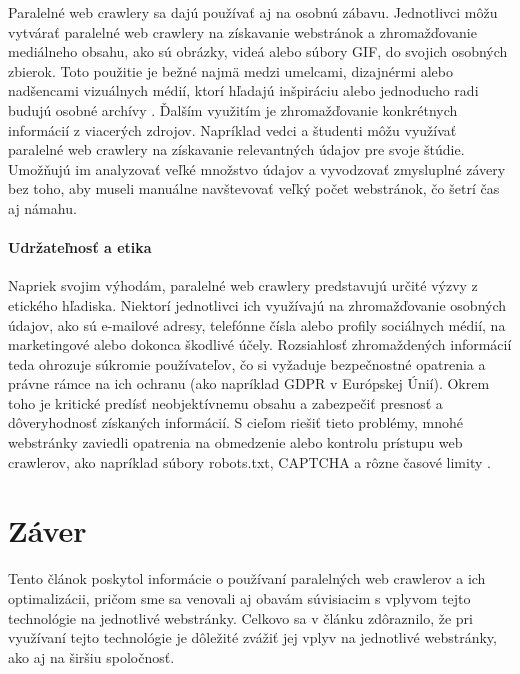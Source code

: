\documentclass[10pt,twoside,slovak,a4paper]{article}
\begin{document}
Paralelné web crawlery sa dajú používať aj na osobnú zábavu. Jednotlivci môžu vytvárať paralelné web crawlery na získavanie webstránok a zhromažďovanie mediálneho obsahu, ako sú obrázky, videá alebo súbory GIF, do svojich osobných zbierok. Toto použitie je bežné najmä medzi umelcami, dizajnérmi alebo nadšencami vizuálnych médií, ktorí hľadajú inšpiráciu alebo jednoducho radi budujú osobné archívy \cite{pennock2013web}. Ďalším využitím je zhromažďovanie konkrétnych informácií z viacerých zdrojov. Napríklad vedci a študenti môžu využívať paralelné web crawlery na získavanie relevantných údajov pre svoje štúdie. Umožňujú im analyzovať veľké množstvo údajov a vyvodzovať zmysluplné závery bez toho, aby museli manuálne navštevovať veľký počet webstránok, čo šetrí čas aj námahu.

\paragraph{Udržateľnosť a etika}

Napriek svojim výhodám, paralelné web crawlery predstavujú určité výzvy z etického hľadiska. Niektorí jednotlivci ich využívajú na zhromažďovanie osobných údajov, ako sú e-mailové adresy, telefónne čísla alebo profily sociálnych médií, na marketingové alebo dokonca škodlivé účely. Rozsiahlosť zhromaždených informácií teda ohrozuje súkromie používateľov, čo si vyžaduje bezpečnostné opatrenia a právne rámce na ich ochranu (ako napríklad GDPR v Európskej Únií). Okrem toho je kritické predísť neobjektívnemu obsahu a zabezpečiť presnosť a dôveryhodnosť získaných informácií. S cieľom riešiť tieto problémy, mnohé webstránky zaviedli opatrenia na obmedzenie alebo kontrolu prístupu web crawlerov, ako napríklad súbory robots.txt, CAPTCHA a rôzne časové limity \cite{thelwall2006web}.

\section{Záver}

Tento článok poskytol informácie o používaní paralelných web crawlerov a ich optimalizácii, pričom sme sa venovali aj obavám súvisiacim s vplyvom tejto technológie na jednotlivé webstránky. Celkovo sa v článku zdôraznilo, že pri využívaní tejto technológie je dôležité zvážiť jej vplyv na jednotlivé webstránky, ako aj na širšiu spoločnosť.

\newpage



\end{document}

